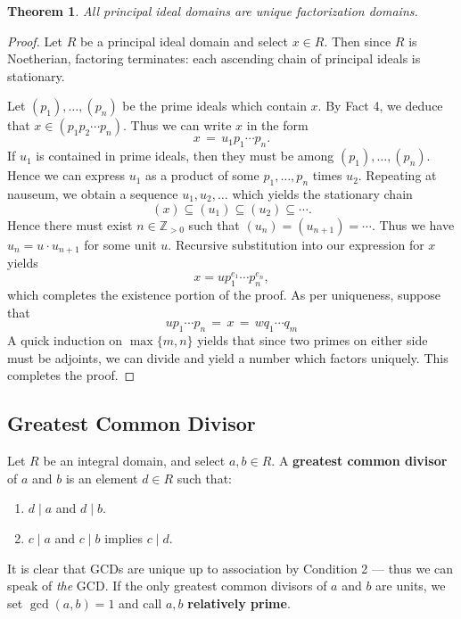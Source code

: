 \documentclass[11pt]{article}
\newtheorem{theorem}{Theorem}
\begin{document}
\begin{adjustwidth}{0.5cm}{}
  \begin{theorem}
    All principal ideal domains are unique factorization domains.
  \end{theorem}
  \begin{proof}
    Let $R$ be a principal ideal domain and select $x \in R$. Then since $R$ is Noetherian, factoring terminates: each ascending chain of principal ideals is stationary.

    Let $(p_{1}), \ldots, (p_{n})$ be the prime ideals which contain $x$. By Fact 4, we deduce that $x \in (p_{1}p_{2} \cdots p_{n})$. Thus we can write $x$ in the form
    \[
      x \, = \, u_{1} p_{1} \cdots p_{n}.
    \]
    If $u_{1}$ is contained in prime ideals, then they must be among $(p_{1}), \ldots, (p_{n})$. Hence we can express $u_{1}$ as a product of some $p_{1}, \ldots, p_{n}$ times $u_{2}$. Repeating at nauseum, we obtain a sequence $u_{1}, u_{2}, \ldots$ which yields the stationary chain
    \[
      (x) \subseteq (u_{1}) \subseteq (u_{2}) \subseteq \cdots.
    \]
    Hence there must exist $n \in \mathbb{Z}_{> 0}$ such that $(u_{n}) = (u_{n + 1}) = \cdots$. Thus we have $u_{n} = u \cdot u_{n + 1}$ for some unit $u$. Recursive substitution into our expression for $x$ yields
    \[
      x = u p_{1}^{e_{1}} \cdots p_{n}^{e_{n}},
    \]
    which completes the existence portion of the proof. As per uniqueness, suppose that
    \[
      u p_{1} \cdots p_{n} \, = \, x \, = \, w q_{1} \cdots q_{m}
    \]
    A quick induction on $\max \{ m, n \}$ yields that since two primes on either side must be adjoints, we can divide and yield a number which factors uniquely. This completes the proof.
  \end{proof}
\end{adjustwidth}


\subsection{Greatest Common Divisor}

Let $R$ be an integral domain, and select $a, b \in R$. A \textbf{greatest common divisor} of $a$ and $b$ is an element $d \in R$ such that:
\begin{enumerate}
  \item $d \mid a$ and $d \mid b$.
  \item $c \mid a$ and $c \mid b$ implies $c \mid d$.
\end{enumerate}
It is clear that GCDs are unique up to association by Condition 2 --- thus we can speak of \textit{the} GCD. If the only greatest common divisors of $a$ and $b$ are units, we set $\gcd(a, b) = 1$ and call $a, b$ \textbf{relatively prime}.
\end{document}
